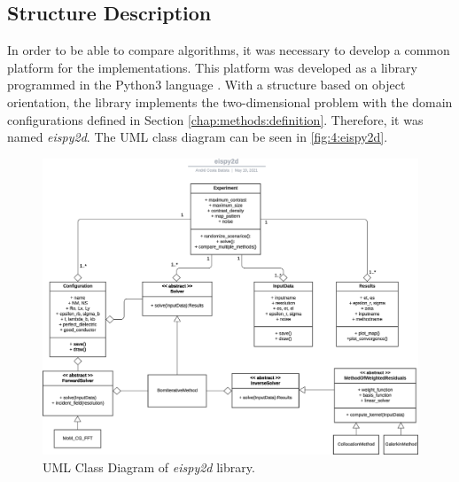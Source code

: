 		\subsection{Structure Description}\label{chap:proposed-methodology:library:performance}

			In order to be able to compare algorithms, it was necessary to develop a common platform for the implementations. This platform was developed as a library programmed in the Python3 language \citep{vanrossum2010python}. With a structure based on object orientation, the library implements the two-dimensional problem with the domain configurations defined in Section \ref{chap:methods:definition}. Therefore, it was named \textit{eispy2d}. The UML class diagram can be seen in \autoref{fig:4:eispy2d}.
			\begin{figure}[!h]
				\centering
				\includegraphics[width=\textwidth]{./figuras/eispy2d.eps}
				\caption[UML Class Diagram of \textit{eispy2d} library.]{UML Class Diagram of \textit{eispy2d} library.}
				\label{fig:4:eispy2d}
			\end{figure}
			
